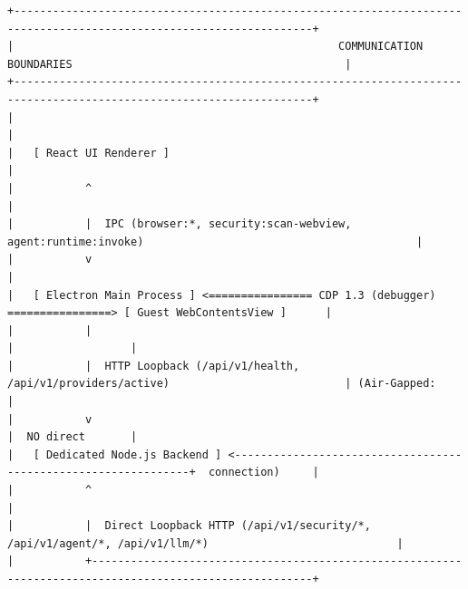 \documentclass[11pt,a4paper]{article}
\begin{document}
\begin{lstlisting}
+--------------------------------------------------------------------------------------------------------------------+
|                                                  COMMUNICATION BOUNDARIES                                          |
+--------------------------------------------------------------------------------------------------------------------+
|                                                                                                                    |
|   [ React UI Renderer ]                                                                                            |
|           ^                                                                                                        |
|           |  IPC (browser:*, security:scan-webview, agent:runtime:invoke)                                          |
|           v                                                                                                        |
|   [ Electron Main Process ] <================ CDP 1.3 (debugger) ================> [ Guest WebContentsView ]      |
|           |                                                                                     |                  |
|           |  HTTP Loopback (/api/v1/health, /api/v1/providers/active)                           | (Air-Gapped:     |
|           v                                                                                     |  NO direct       |
|   [ Dedicated Node.js Backend ] <---------------------------------------------------------------+  connection)     |
|           ^                                                                                                        |
|           |  Direct Loopback HTTP (/api/v1/security/*, /api/v1/agent/*, /api/v1/llm/*)                             |
|           +--------------------------------------------------------------------------------------------------------+
\end{lstlisting}
\end{document}

